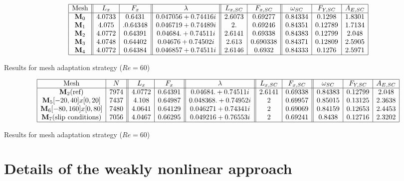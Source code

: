 \documentclass[twocolumn,10pt]{asme2ej}
\begin{document}
\begin{table*}
$$
\begin{array}{|c||c|c||c||c|c||c|c|c|}
\hline
\mbox{Mesh} & L_x & F_x & \lambda & L_{x,SC} & F_{x,SC} & \omega_{SC}  & F_{Y,SC} & A_{E,SC} \\
\hline
\mathbf{M}_0 & 4.0733 & 0.6431 	& 0.047056 + 0.74416i 		& 2.6073  &0.69277 		&  0.84334 & 0.1298 & 1.8301  \\
\mathbf{M}_1 & 4.075 &.  0.64348  	& 0.046719 + 0.74489i 		& 2.          & 0.69246 	& 0.84351 & 0.12789 & 1.7134 \\  
\mathbf{M}_2 & 4.0772 & 0.64391 	& 0.04684. +  0.74511i 		& 2.6141  & 0.69338 	& 0.84383 & 0.12799 & 2.048   \\ 
\mathbf{M}_3 & 4.0748 & 0.64402 	& 0.04676  + 0.74502i 		& 2.613 	& 0.690338 	& 0.84371 & 0.12809 & 2.5905 \\
\mathbf{M}_4 & 4.0772 & 0.64384	& 0.046857+0.74511i 		& 2.6146 	& 0.6932		& 0.84333 & 0.1276	 & 2.5971 \\
\hline
\end{array}
$$
\caption{Results for mesh adaptation strategy ($Re = 60$)}
\end{table*}





\begin{table*}
$$
\begin{array}{|c|c||c|c||c||c|c||c|c|c|}
\hline
\mbox{Mesh} & N & L_x & F_x & \lambda & L_{x,SC} & F_{x,SC} & \omega_{SC}  & F_{Y,SC} & A_{E,SC} \\
\hline
\mathbf{M}_2 \mbox{(ref)} 	& 7974  	& 4.0772 & 0.64391 	& 0.04684. +  0.74511i 	& 2.6141  & 0.69338 	& 0.84383 & 0.12799 & 2.048   \\ 


\mathbf{M}_5 [-20,40]x[0,20] 	& 7437	&  4.108 & 0.64987 	& 0.048368. +  0.74952i 	& 2  & 0.69957 	& 0.85015 & 0.13125 & 2.3638   \\ 
\mathbf{M}_6 [-80,160]x[0,80] 	& 7480	& 4.0641 & 0.64129		& 0.046271 + 0.74341i 	& 2 	& 0.69069 	& 0.84159 & 0.12653 & 2.4453 \\
\mathbf{M}_7 \mbox{(slip conditions)}	 & 7056	& 4.0467 &0.66295		& 0.049216+0.76553i 	& 2 	& 0.69241		& 0.8438  & 0.12716	 & 2.3202 \\
\hline
\end{array}
$$
\caption{Results for mesh adaptation strategy ($Re = 60$)}
\end{table*}

\section{Details of the weakly nonlinear approach}
\end{document}

